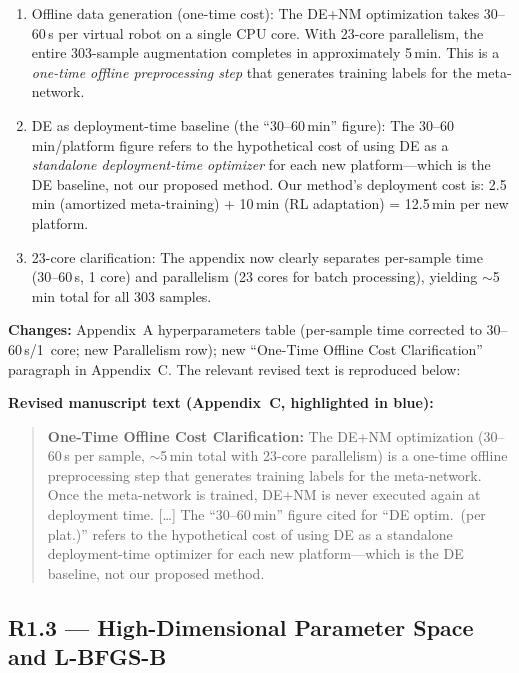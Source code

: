 \documentclass[11pt,a4paper]{article}
\begin{document}
\begin{enumerate}[leftmargin=*, label=\arabic*)]
\item Offline data generation (one-time cost): The DE+NM optimization takes 30--60\,s per virtual robot on a single CPU core. With 23-core parallelism, the entire 303-sample augmentation completes in approximately 5\,min. This is a \emph{one-time offline preprocessing step} that generates training labels for the meta-network.

\item DE as deployment-time baseline (the ``30--60\,min'' figure): The 30--60\,min/platform figure refers to the hypothetical cost of using DE as a \emph{standalone deployment-time optimizer} for each new platform---which is the DE baseline, not our proposed method. Our method's deployment cost is: 2.5\,min (amortized meta-training) + 10\,min (RL adaptation) = 12.5\,min per new platform.

\item 23-core clarification: The appendix now clearly separates per-sample time (30--60\,s, 1 core) and parallelism (23 cores for batch processing), yielding $\sim$5\,min total for all 303 samples.
\end{enumerate}

\textbf{Changes:} Appendix~A hyperparameters table (per-sample time corrected to 30--60\,s/1~core; new Parallelism row); new ``One-Time Offline Cost Clarification'' paragraph in Appendix~C. The relevant revised text is reproduced below:

\textbf{Revised manuscript text (Appendix~C, highlighted in blue):}

\begin{quote}\color{blue}\small
\textbf{One-Time Offline Cost Clarification:} The DE+NM optimization (30--60\,s per sample, $\sim$5\,min total with 23-core parallelism) is a one-time offline preprocessing step that generates training labels for the meta-network. Once the meta-network is trained, DE+NM is never executed again at deployment time. [\ldots] The ``30--60\,min'' figure cited for ``DE optim.\ (per plat.)'' refers to the hypothetical cost of using DE as a standalone deployment-time optimizer for each new platform---which is the DE baseline, not our proposed method.
\end{quote}

\subsection*{R1.3 --- High-Dimensional Parameter Space and L-BFGS-B}
\end{document}
